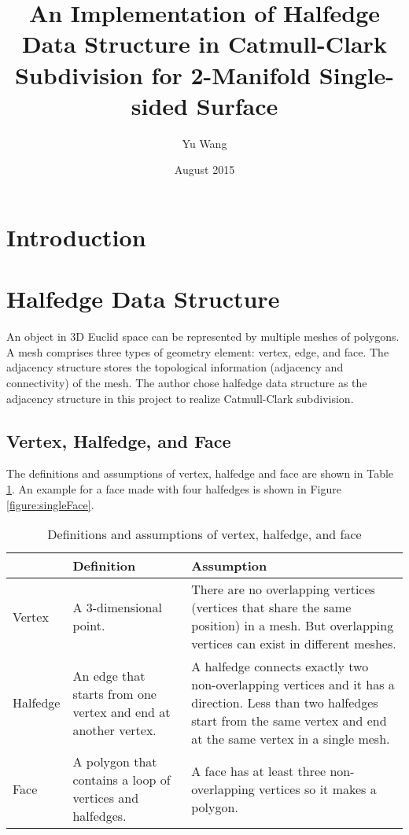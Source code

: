 \documentclass[12pt]{article}
\title{An Implementation of Halfedge Data Structure in Catmull-Clark Subdivision for 2-Manifold Single-sided Surface}
\author{Yu Wang}
\date{August 2015}
\begin{document}
\maketitle
\newpage


\section{Introduction}

\section{Halfedge Data Structure} \label{sec:halfedge}

An object in 3D Euclid space can be represented by multiple meshes of polygons. A mesh comprises three types of geometry element: vertex, edge, and face. The adjacency structure stores the topological information (adjacency and connectivity) of the mesh. The author chose halfedge data structure as the adjacency structure in this project to realize Catmull-Clark subdivision.

\subsection{Vertex, Halfedge, and Face}

The definitions and assumptions of vertex, halfedge and face are shown in Table \ref{table:vhfdef}. An example for a face made with four halfedges is shown in Figure \ref{figure:singleFace}.

\begin{table}[h]
\centering
\begin{tabular}{| l | p{} | p{}|}
\hline
		&	Definition	& Assumption	\\
\hline
Vertex	&	A 3-dimensional point.		&	There are no overlapping vertices (vertices that share the same position) in a mesh. But overlapping vertices can exist in different meshes.		\\
\hline
Halfedge	&	An edge that starts from one vertex and end at another vertex. & A halfedge connects exactly two non-overlapping vertices and it has a direction. Less than two halfedges start from the same vertex and end at the same vertex in a single mesh.\\
\hline
Face		&	A polygon that contains a loop of vertices and halfedges.	& A face has at least three non-overlapping vertices so it makes a polygon.\\
\hline
\end{tabular}
\caption{Definitions and assumptions of vertex, halfedge, and face} 
\label{table:vhfdef}
\end{table}
\end{document}
